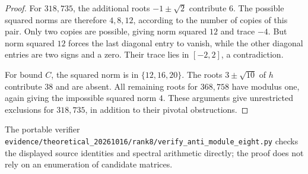 \begin{proof}
For $318,735$, the additional roots $-1\pm\sqrt2$ contribute $6$.
The possible squared norms are therefore $4,8,12$, according to the
number of copies of this pair. Only two copies are possible, giving
norm squared $12$ and trace $-4$. But norm squared $12$ forces the last
diagonal entry to vanish, while the other diagonal entries are two
signs and a zero. Their trace lies in $[-2,2]$, a contradiction.

For bound $C$, the squared norm is in $\{12,16,20\}$. The roots
$3\pm\sqrt{10}$ of $h$ contribute $38$ and are absent. All remaining
roots for $368,758$ have modulus one, again giving the impossible
squared norm $4$. These arguments give unrestricted exclusions for $318,735$,
in addition to their pivotal obstructions.
\end{proof}

The portable verifier
\texttt{evidence/theoretical\_20261016/rank8/verify\_anti\_module\_eight.py}
checks the displayed source identities and spectral arithmetic directly;
the proof does not rely on an enumeration of candidate matrices.
